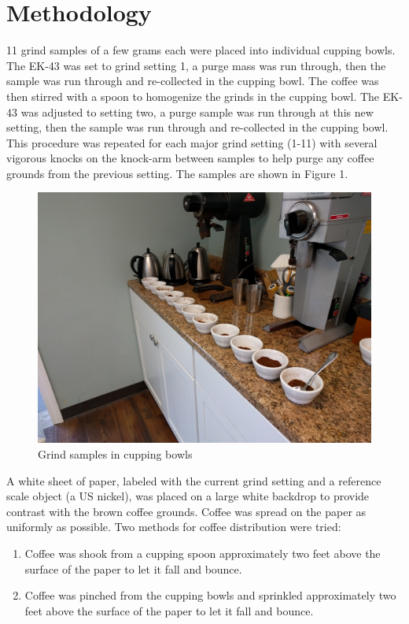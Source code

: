 \documentclass[10pt,a4paper,twocolumn,notitlepage]{article}
\begin{document}
\section{Methodology}
11 grind samples of a few grams each were placed into individual cupping bowls. The EK-43 was set to grind setting 1, a purge mass was run through, then the sample was run through and re-collected in the cupping bowl. The coffee was then stirred with a spoon to homogenize the grinds in the cupping bowl. The EK-43 was adjusted to setting two, a purge sample was run through at this new setting, then the sample was run through and re-collected in the cupping bowl. This procedure was repeated for each major grind setting (1-11) with several vigorous knocks on the knock-arm between samples to help purge any coffee grounds from the previous setting. The samples are shown in Figure 1. 
\begin{center}\begin{figure}[h!]
 \includegraphics[width=\columnwidth]{preAdjustmentData/IMG_20190831_132715.jpg}
 \caption{Grind samples in cupping bowls}\label{fig:cuppingBowls}\end{figure}\end{center}
A white sheet of paper, labeled with the current grind setting and a reference scale object (a US nickel), was placed on a large white backdrop to provide contrast with the brown coffee grounds. Coffee was spread on the paper as uniformly as possible. Two methods for coffee distribution were tried:

\begin{enumerate}
\item Coffee was shook from a cupping spoon approximately two feet above the surface of the paper to let it fall and bounce.
\item Coffee was pinched from the cupping bowls and sprinkled approximately two feet above the surface of the paper to let it fall and bounce.
\end{enumerate}
\end{document}
